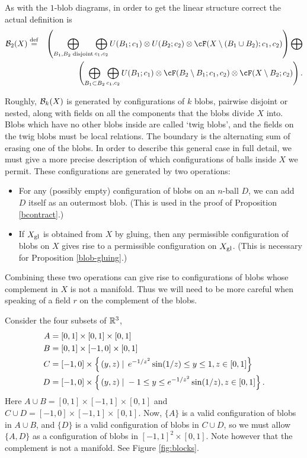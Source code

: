 As with the $1$-blob diagrams, in order to get the linear structure correct the actual definition is 
\begin{eqnarray*}
	\bc_2(X) & \deq &
	\left( 
		\bigoplus_{B_1, B_2\; \text{disjoint}} \bigoplus_{c_1, c_2}
			U(B_1; c_1) \otimes U(B_2; c_2) \otimes \cF(X\setmin (B_1\cup B_2); c_1, c_2)
	\right)  \bigoplus \\
	&& \quad\quad  \left( 
		\bigoplus_{B_1 \subset B_2} \bigoplus_{c_1, c_2}
			U(B_1; c_1) \otimes \cF(B_2 \setmin B_1; c_1, c_2) \tensor \cF(X \setminus B_2; c_2)
	\right) .
\end{eqnarray*}

\medskip

Roughly, ${\mathcal B}_k(X)$ is generated by configurations of $k$ blobs, pairwise disjoint or nested, 
along with fields on all the components that the blobs divide $X$ into. 
Blobs which have no other blobs inside are called `twig blobs', 
and the fields on the twig blobs must be local relations.
The boundary is the alternating sum of erasing one of the blobs.
In order to describe this general case in full detail, we must give a more precise description of
which configurations of balls inside $X$ we permit.
These configurations are generated by two operations:
\begin{itemize}
\item For any (possibly empty) configuration of blobs on an $n$-ball $D$, we can add
$D$ itself as an outermost blob.
(This is used in the proof of Proposition \ref{bcontract}.)
\item If $X_\mathrm{gl}$ is obtained from $X$ by gluing, then any permissible configuration of blobs
on $X$ gives rise to a permissible configuration on $X_\mathrm{gl}$.
(This is necessary for Proposition \ref{blob-gluing}.)
\end{itemize}
Combining these two operations can give rise to configurations of blobs whose complement in $X$ is not
a manifold.
Thus we will need to be more careful when speaking of a field $r$ on the complement of the blobs.

\begin{example} \label{sin1x-example}
Consider the four subsets of $\mathbb R^3$,
\begin{align*}
A & = [0,1] \times [0,1] \times [0,1] \\
B & = [0,1] \times [-1,0] \times [0,1] \\
C & = [-1,0] \times \left\{ \left. (y,z) \;\right| \; e^{-1/z^2} \sin(1/z) \leq y \leq 1, z \in [0,1] \right\} \\
D & = [-1,0] \times \left\{ \left. (y,z) \;\right| \; -1 \leq y \leq e^{-1/z^2} \sin(1/z), z \in [0,1] \right\}.
\end{align*}
Here $A \cup B = [0,1] \times [-1,1] \times [0,1]$ and $C \cup D = [-1,0] \times [-1,1] \times [0,1]$. 
Now, $\{A\}$ is a valid configuration of blobs in $A \cup B$, 
and $\{D\}$ is a valid configuration of blobs in $C \cup D$, 
so we must allow $\{A, D\}$ as a configuration of blobs in $[-1,1]^2 \times [0,1]$. 
Note however that the complement is not a manifold. See Figure \ref{fig:blocks}.
\end{example}

